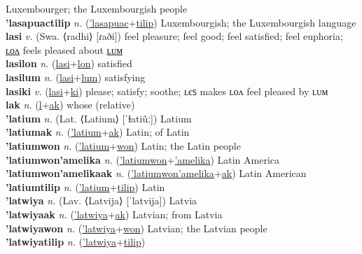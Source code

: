 Luxembourger; the Luxembourgish people \label{'lasapuacwon} \\
\textbf{'lasapuactilip} \textit{n.} (\hyperref['lasapuac]{'lasapuac}+\hyperref[tilip]{tilip})
Luxembourgish; the Luxembourgish language \label{'lasapuactilip} \\
\textbf{lasi} \textit{v.} (Swa. ⟨radhi⟩ [ɾaði])
feel pleasure; feel good; feel satisfied; feel euphoria; \hyperref[lasilon]{ʟᴏᴧ} feels pleased about \hyperref[lasilum]{ʟᴜᴍ} \label{lasi} \\
\textbf{lasilon} \textit{n.} (\hyperref[lasi]{lasi}+\hyperref[lon]{lon})
satisfied \label{lasilon} \\
\textbf{lasilum} \textit{n.} (\hyperref[lasi]{lasi}+\hyperref[lum]{lum})
satisfying \label{lasilum} \\
\textbf{lasiki} \textit{v.} (\hyperref[lasi]{lasi}+\hyperref[ki]{ki})
please; satisfy; soothe; ʟєꜱ makes ʟᴏᴧ feel pleased by ʟᴜᴍ \label{lasiki} \\
\textbf{lak} \textit{n.} (\hyperref[l]{l}+\hyperref[ak]{ak})
whose (relative) \label{lak} \\
\textbf{'latium} \textit{n.} (Lat. ⟨Latium⟩ [ˈɫatiũː])
Latium \label{'latium} \\
\textbf{'latiumak} \textit{n.} (\hyperref['latium]{'latium}+\hyperref[ak]{ak})
Latin; of Latin \label{'latiumak} \\
\textbf{'latiumwon} \textit{n.} (\hyperref['latium]{'latium}+\hyperref[won]{won})
Latin; the Latin people \label{'latiumwon} \\
\textbf{'latiumwon'amelika} \textit{n.} (\hyperref['latiumwon]{'latiumwon}+\hyperref['amelika]{'amelika})
Latin America \label{'latiumwon'amelika} \\
\textbf{'latiumwon'amelikaak} \textit{n.} (\hyperref['latiumwon'amelika]{'latiumwon'amelika}+\hyperref[ak]{ak})
Latin American \label{'latiumwon'amelikaak} \\
\textbf{'latiumtilip} \textit{n.} (\hyperref['latium]{'latium}+\hyperref[tilip]{tilip})
Latin \label{'latiumtilip} \\
\textbf{'latwiya} \textit{n.} (Lav. ⟨Latvija⟩ [ˈlatvija])
Latvia \label{'latwiya} \\
\textbf{'latwiyaak} \textit{n.} (\hyperref['latwiya]{'latwiya}+\hyperref[ak]{ak})
Latvian; from Latvia \label{'latwiyaak} \\
\textbf{'latwiyawon} \textit{n.} (\hyperref['latwiya]{'latwiya}+\hyperref[won]{won})
Latvian; the Latvian people \label{'latwiyawon} \\
\textbf{'latwiyatilip} \textit{n.} (\hyperref['latwiya]{'latwiya}+\hyperref[tilip]{tilip})

